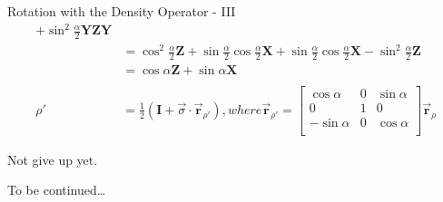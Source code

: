 \documentclass{beamer}
\begin{document}
\begin{frame}{Rotation with the Density Operator - III}
{\begin{align*}
                + \sin^2\frac{\alpha}2 \mathbf{Y}\mathbf{Z}\mathbf{Y} \\
            &=    \cos^2\frac{\alpha}2 \mathbf{Z}
                + \sin\frac{\alpha}2 \cos\frac{\alpha}2 \mathbf{X}
                + \sin\frac{\alpha}2 \cos\frac{\alpha}2 \mathbf{X}
                - \sin^2\frac{\alpha}2 \mathbf{Z} \\
            &= \cos\alpha \mathbf{Z} + \sin\alpha \mathbf{X} \\
      \\
      \rho' &= \frac{1}2 ( \mathbf{I} + \overrightarrow{\sigma} \cdot \overrightarrow{\mathbf{r}}_{\rho'} )
            , where \overrightarrow{\mathbf{r}}_{\rho'} =
              \begin{bmatrix}
                \cos\alpha  & 0 & \sin\alpha \\
                0           & 1 & 0 \\
                -\sin\alpha & 0 & \cos\alpha \\
              \end{bmatrix}
              \overrightarrow{\mathbf{r}}_{\rho}
    \end{align*}
  }%
\end{frame}


\begin{frame}
  Not give up yet.
  \par
  To be continued\dots
\end{frame}
\end{document}
